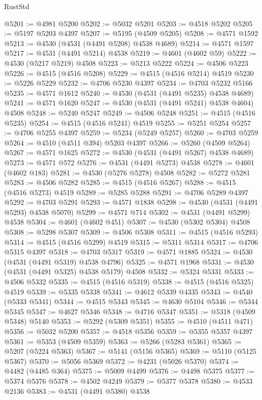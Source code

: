 \begin{lexlean}{RustStd}
\begin{coremodule}
@5201 := @4981 @5200
@5202 := @5032 @5201
@5203 := @4518 @5202
@5205 := @5197 @5203 @4397
@5207 := @5195 (@4509 @5205)
@5208 := @4571 @1592
@5213 := @4530 (@4531 (@4491 @5208) @4538 @4689)
@5214 := @4571 @1597
@5217 := @4531 (@4491 @5214) @4538
@5219 := @4601 (@4602 @59)
@5222 := @4530 (@5217 @5219) @4508
@5223 := @5213 @5222
@5224 := @4506 @5223
@5226 := @4515 (@4516 @5208)
@5229 := @4515 (@4516 @5214) @4519
@5230 := @5226 @5229
@5232 := @4706 @5230 @4397
@5234 := @4703 @5232 @5166
@5235 := @4571 @1612
@5240 := @4530 (@4531 (@4491 @5235) @4538 @4689)
@5241 := @4571 @1620
@5247 := @4530 (@4531 (@4491 @5241) @4538 @4604) @4508
@5248 := @5240 @5247
@5249 := @4506 @5248
@5251 := @4515 (@4516 @5235)
@5254 := @4515 (@4516 @5241) @4519
@5255 := @5251 @5254
@5257 := @4706 @5255 @4397
@5259 := @5234 (@5249 @5257)
@5260 := @4703 @5259
@5264 := @4510 (@4511 @394) @5203 @4397
@5266 := @5260 (@4509 @5264)
@5267 := @4571 @1625
@5272 := @4530 (@4531 (@4491 @5267) @4538 @4689)
@5273 := @4571 @572
@5276 := @4531 (@4491 @5273) @4538
@5278 := @4601 (@4602 @183)
@5281 := @4530 (@5276 @5278) @4508
@5282 := @5272 @5281
@5283 := @4506 @5282
@5285 := @4515 (@4516 @5267)
@5288 := @4515 (@4516 @5273) @4519
@5289 := @5285 @5288
@5291 := @4706 @5289 @4397
@5292 := @4703 @5291
@5293 := @4571 @1838
@5298 := @4530 (@4531 (@4491 @5293) @4538 @5070)
@5299 := @4571 @714
@5302 := @4531 (@4491 @5299) @4538
@5304 := @4601 (@4602 @451)
@5307 := @4530 (@5302 @5304) @4508
@5308 := @5298 @5307
@5309 := @4506 @5308
@5311 := @4515 (@4516 @5293)
@5314 := @4515 (@4516 @5299) @4519
@5315 := @5311 @5314
@5317 := @4706 @5315 @4397
@5318 := @4703 @5317
@5319 := @4571 @1885
@5324 := @4530 (@4531 (@4491 @5319) @4538 @4796)
@5325 := @4571 @1968
@5331 := @4530 (@4531 (@4491 @5325) @4538 @5179) @4508
@5332 := @5324 @5331
@5333 := @4506 @5332
@5335 := @4515 (@4516 @5319)
@5338 := @4515 (@4516 @5325) @4519
@5339 := @5335 @5338
@5341 := @4612 @5339 @4335
@5343 := @4540 (@5333 @5341)
@5344 := @4515 @5343
@5345 := @4630 @5104
@5346 := @5344 @5345
@5347 := @4627 @5346
@5348 := @4716 @5347
@5351 := @5318 (@4509 @5348) @5140
@5353 := @5292 (@5309 @5351)
@5355 := @4510 (@4511 @471)
@5356 := @5032 @5200
@5357 := @4518 @5356
@5359 := @5355 @5357 @4397
@5361 := @5353 (@4509 @5359)
@5363 := @5266 (@5283 @5361)
@5365 := @5207 (@5224 @5363)
@5367 := @5141 (@5156 @5365)
@5369 := @5110 (@5125 @5367)
@5370 := @5056 @5369
@5372 := @4231 (@5026 @5370)
@5374 := @4482 (@4485 @364)
@5375 := @5009 @4499
@5376 := @4498 @5375
@5377 := @5374 @5376
@5378 := @4502 @4249
@5379 := @5377 @5378
@5380 := @4533 @2136
@5383 := @4531 (@4491 @5380) @4538

\end{coremodule}
\end{lexlean}
